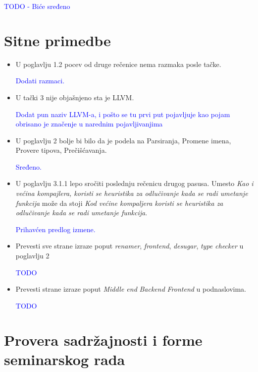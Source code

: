 \documentclass[a4paper]{report}
\newcommand{\odgovor}[1]{\textcolor{blue}{#1}}
\begin{document}
\odgovor{TODO - Biće sređeno}


\section{Sitne primedbe}
\begin{itemize}
\item U poglavlju 1.2 pocev od druge rečenice nema razmaka posle tačke.

\odgovor{Dodati razmaci.}

\item U tački 3 nije objašnjeno sta je LLVM.

\odgovor{Dodat pun naziv LLVM-a, i pošto se tu prvi put pojavljuje kao pojam obrisano je značenje u narednim pojavljivanjima}

\item U poglavlju 2 bolje bi bilo da je podela na  Parsiranja, Promene imena, Provere tipova, Prečišćavanja.

\odgovor{Sređeno.}

\item U poglavlju 3.1.1 lepo sročiti poslednju rečenicu drugog pasusa. Umesto \emph{Kao i većina kompajlera, koristi se heuristika za odlučivanje kada se radi umetanje funkcija} može da stoji \emph{Kod većine kompaljera koristi se heuristika za odlučivanje kada se radi umetanje funkcija}.

\odgovor{Prihavćen predlog izmene.}

\item Prevesti sve strane izraze poput \emph{renamer}, \emph{frontend}, \emph{desugar}, \emph{type checker} u poglavlju 2

\odgovor{TODO}

\item Prevesti strane izraze poput \emph{Middle end} \emph{Backend} \emph{Frontend} u podnaslovima.

\odgovor{TODO}

\end{itemize}
\section{Provera sadržajnosti i forme seminarskog rada}
\end{document}
